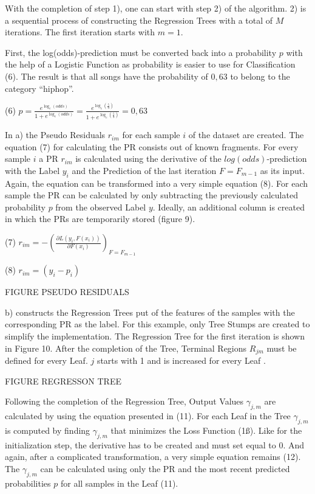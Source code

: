 With the completion of step 1), one can start with step 2) of the algorithm. 2) is a sequential 
process of constructing the Regression Trees with a total of \(M\) iterations. The first iteration 
starts with \(m = 1\). 

First, the log(odds)-prediction must be converted back into a probability \(p\) with the help of a 
Logistic Function as probability is easier to use for Classification (6). The result is 
that all songs have the probability of \(0,63\) to belong to the category “hiphop”.

(6) \(p = \frac{e^{\log_{e}(odds)}}{1 + e^{\log_{e}(odds)}} = \frac{e^{\log_{e}(\frac{5}{3})}}{1 + e^{\log_{e}(\frac{5}{3})}} = 0,63\)

In a) the Pseudo Residuals \(r_{im}\) for each sample \(i\) of the dataset are created. The equation (7) 
for calculating the PR consists out of known fragments. For every sample \(i\) a PR \(r_{im}\) 
is calculated using the derivative of the \(log(odds)\)-prediction with the Label \(y_{i}\) and the 
Prediction of the last iteration \(F = F_{m - 1}\) as its input. Again, the equation can be 
transformed into a very simple equation (8). For each sample the PR can be calculated by only 
subtracting the previously calculated probability \(p\) from the observed Label \(y\). Ideally, an additional 
column is created in which the PRs are temporarily stored (figure 9). 

(7) \(r_{im} = - (\frac{\partial L(y_{i}, F(x_{i}))}{\partial F(x_{i})})_{F = F_{m - 1}} \)

(8) \(r_{im} = (y_{i} - p_{i})\)

FIGURE PSEUDO RESIDUALS 

b) constructs the Regression Trees put of the features of the samples with the corresponding 
PR as the label. For this example, only Tree Stumps are created to simplify the implementation. 
The Regression Tree for the first iteration is shown in Figure 10. After the completion of the 
Tree, Terminal Regions \(R_{jm}\) must be defined for every Leaf. \(j\) starts with 1 and is increased for 
every Leaf \cite[p.1195]{Friedman_2001}. 

FIGURE REGRESSON TREE 

Following the completion of the Regression Tree, Output Values \(\gamma_{j, m}\) are calculated by using 
the equation presented in (11). For each Leaf in the Tree \(\gamma_{j, m}\) is computed by finding 
\(\gamma_{j, m}\) that minimizes the Loss Function (1ß). Like for the initialization step, the derivative has 
to be created and must set equal to \(0\). And again, after a complicated transformation, a very simple 
equation remains (12). The \(\gamma_{j, m}\)  can be calculated using only the PR and the most 
recent predicted probabilities \(p\) for all samples in the Leaf (11). 

